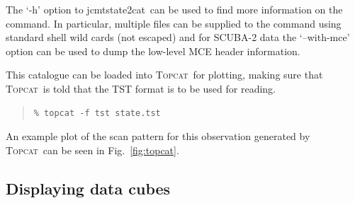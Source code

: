 \documentclass[twoside,11pt]{article}
\newenvironment{myquote}{\begin{quote}\begin{small}}{\end{small}\end{quote}}
\newcommand{\topcat}{\xref{\textsc{Topcat}}{sun253}{}}
\newcommand{\task}[1]{\textsf{#1}}
\newcommand{\jcmtstate}{\xref{\task{jcmtstate2cat}}{sun258}{JCMTSTATE2CAT}}
\newcommand{\xref}[3]{#1}
\newcommand{\xlabel}[1]{}
\renewcommand{\_}{\texttt{\symbol{95}}}
\begin{document}
The `-h' option to \jcmtstate\ can be used to find more information on
the command. In particular, multiple files can be supplied to the
command using standard shell wild cards (not escaped) and for SCUBA-2
data the `--with-mce' option can be used to dump the low-level MCE
header information.

This catalogue can be loaded into \topcat\ for plotting, making sure
that \topcat\ is told that the TST format is to be used for reading.

\begin{myquote}
\begin{verbatim}
% topcat -f tst state.tst
\end{verbatim}
\end{myquote}

An example plot of the scan pattern for this observation generated by
\topcat\ can be seen in Fig.~\ref{fig:topcat}.

\subsection{\xlabel{display_cube}Displaying data cubes}
\end{document}
